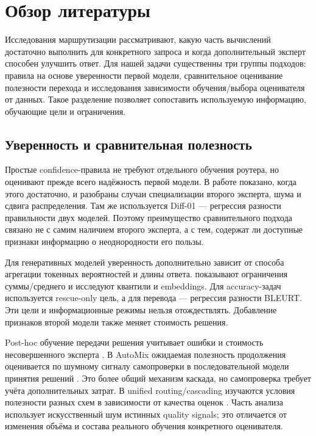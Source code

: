 \section{Обзор литературы}\label{sec:related_works}
Исследования маршрутизации рассматривают, какую часть вычислений
достаточно выполнить для конкретного запроса и когда дополнительный
эксперт способен улучшить ответ. Для нашей задачи существенны три
группы подходов: правила на основе уверенности первой модели,
сравнительное оценивание полезности перехода и исследования зависимости
обучения/выбора оценивателя от данных. Такое разделение позволяет
сопоставить используемую информацию, обучающие цели и ограничения.

\subsection{Уверенность и сравнительная полезность}
Простые confidence-правила не требуют отдельного обучения роутера,
но оценивают прежде всего надёжность первой модели. В работе
\citet{jitkrittum2023confidence} показано, когда этого достаточно,
и разобраны случаи специализации второго эксперта, шума и сдвига
распределения. Там же используется Diff-01 --- регрессия разности
правильности двух моделей. Поэтому преимущество сравнительного
подхода связано не с самим наличием второго эксперта, а с тем,
содержат ли доступные признаки информацию о неоднородности его пользы.

Для генеративных моделей уверенность дополнительно зависит от способа
агрегации токенных вероятностей и длины ответа.
\citet{gupta2024cascades} показывают ограничения суммы/среднего
и исследуют квантили и embeddings. Для accuracy-задач используется
rescue-only цель, а для перевода --- регрессия разности BLEURT.
Эти цели и информационные режимы нельзя отождествлять. Добавление
признаков второй модели также меняет стоимость решения.

Post-hoc обучение передачи решения учитывает ошибки и стоимость
несовершенного эксперта \citep{narasimhan2022posthoc}.
В AutoMix ожидаемая полезность продолжения оценивается по шумному
сигналу самопроверки в последовательной модели принятия решений
\citep{aggarwal2024automix}. Это более общий механизм каскада,
но самопроверка требует учёта дополнительных затрат.
В unified routing/cascading изучаются условия полезности разных
схем в зависимости от качества оценок \citep{dekoninck2025unified}.
Часть анализа использует искусственный шум истинных quality signals;
это отличается от изменения объёма и состава реального обучения
конкретного оценивателя.

